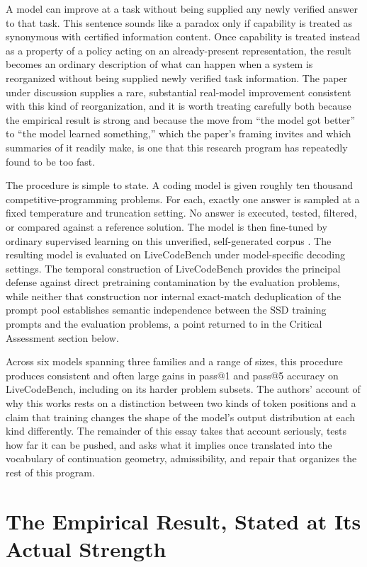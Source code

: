 \documentclass[11pt]{article}
\begin{document}
A model can improve at a task without being supplied any newly verified answer to that task. This sentence sounds like a paradox only if capability is treated as synonymous with certified information content. Once capability is treated instead as a property of a policy acting on an already-present representation, the result becomes an ordinary description of what can happen when a system is reorganized without being supplied newly verified task information. The paper under discussion supplies a rare, substantial real-model improvement consistent with this kind of reorganization, and it is worth treating carefully both because the empirical result is strong and because the move from ``the model got better'' to ``the model learned something,'' which the paper's framing invites and which summaries of it readily make, is one that this research program has repeatedly found to be too fast.

The procedure is simple to state. A coding model is given roughly ten thousand competitive-programming problems. For each, exactly one answer is sampled at a fixed temperature and truncation setting. No answer is executed, tested, filtered, or compared against a reference solution. The model is then fine-tuned by ordinary supervised learning on this unverified, self-generated corpus \cite{zhang2026ssd}. The resulting model is evaluated on LiveCodeBench \cite{jain2024livecodebench} under model-specific decoding settings. The temporal construction of LiveCodeBench provides the principal defense against direct pretraining contamination by the evaluation problems, while neither that construction nor internal exact-match deduplication of the prompt pool establishes semantic independence between the SSD training prompts and the evaluation problems, a point returned to in the Critical Assessment section below.

Across six models spanning three families and a range of sizes, this procedure produces consistent and often large gains in pass@1 and pass@5 accuracy on LiveCodeBench, including on its harder problem subsets. The authors' account of why this works rests on a distinction between two kinds of token positions and a claim that training changes the shape of the model's output distribution at each kind differently. The remainder of this essay takes that account seriously, tests how far it can be pushed, and asks what it implies once translated into the vocabulary of continuation geometry, admissibility, and repair that organizes the rest of this program.

\section{The Empirical Result, Stated at Its Actual Strength}
\end{document}
